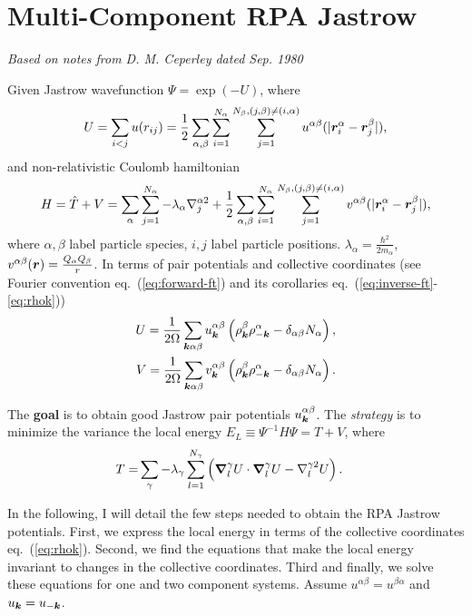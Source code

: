 \section{Multi-Component RPA Jastrow}

\textit{Based on notes from D. M. Ceperley dated Sep. 1980}

Given Jastrow wavefunction $\Psi=\exp(-U)$, where
\begin{align}
U = \sum\limits_{i<j} u(r_{ij}) = \frac{1}{2} \sum\limits_{\alpha, \beta} \sum\limits_{i=1}^{N_\alpha} \sum\limits_{j=1}^{N_\beta, (j,\beta)\neq(i,\alpha)}
u^{\alpha\beta}(\vert\boldsymbol{r}_i^\alpha-\boldsymbol{r}_j^\beta\vert), \label{eq:Uurij}
\end{align}
and non-relativistic Coulomb hamiltonian
\begin{align}
H = \hat{T}+V = \sum\limits_{\alpha}\sum\limits_{j=1}^{N_\alpha} -\lambda_{\alpha}\nabla^{\alpha2}_j + \frac{1}{2}\sum\limits_{\alpha, \beta} \sum\limits_{i=1}^{N_\alpha} \sum\limits_{j=1}^{N_\beta, (j,\beta)\neq(i,\alpha)} v^{\alpha\beta}(\vert\boldsymbol{r}_i^\alpha - \boldsymbol{r}_j^\beta \vert),
\end{align}
where $\alpha, \beta$ label particle species, $i, j$ label particle positions. $\lambda_\alpha=\frac{\hbar^2}{2m_\alpha}$, $v^{\alpha\beta}(\boldsymbol{r})=\frac{Q_\alpha Q_\beta}{r}$. In terms of pair potentials and collective coordinates (see Fourier convention eq.~(\ref{eq:forward-ft}) and its corollaries eq.~(\ref{eq:inverse-ft}-\ref{eq:rhok}))
\begin{align}
U = \frac{1}{2\Omega} \sum\limits_{\boldsymbol{k}\alpha\beta}
u^{\alpha\beta}_{\boldsymbol{k}} \left( \rho^\beta_{\boldsymbol{k}}\rho^\alpha_{-\boldsymbol{k}}-\delta_{\alpha\beta}N_\alpha
\right), \label{eq:Uuk} \\
V = \frac{1}{2\Omega} \sum\limits_{\boldsymbol{k}\alpha\beta}
v^{\alpha\beta}_{\boldsymbol{k}} \left( \rho^\beta_{\boldsymbol{k}}\rho^\alpha_{-\boldsymbol{k}}-\delta_{\alpha\beta}N_\alpha \right).
\end{align}

The \textbf{goal} is to obtain good Jastrow pair potentials $u_{\boldsymbol{k}}^{\alpha\beta}$. The \textit{strategy} is to minimize the variance the local energy $E_L\equiv \Psi^{-1}H\Psi = T + V$, where
\begin{align}
T =& \sum\limits_{\gamma}-\lambda_{\gamma}
\sum\limits_{l=1}^{N_\gamma}  \left(\boldsymbol{\nabla}_l^{\gamma}U\cdot\boldsymbol{\nabla}_l^{\gamma}U - \nabla^{\gamma2}_l U \right).
\end{align}

In the following, I will detail the few steps needed to obtain the RPA Jastrow potentials. First, we express the local energy in terms of the collective coordinates eq.~(\ref{eq:rhok}). Second, we find the equations that make the local energy invariant to changes in the collective coordinates. Third and finally, we solve these equations for one and two component systems. Assume $u^{\alpha\beta}=u^{\beta\alpha}$ and $u_{\boldsymbol{k}}=u_{-\boldsymbol{k}}$.

